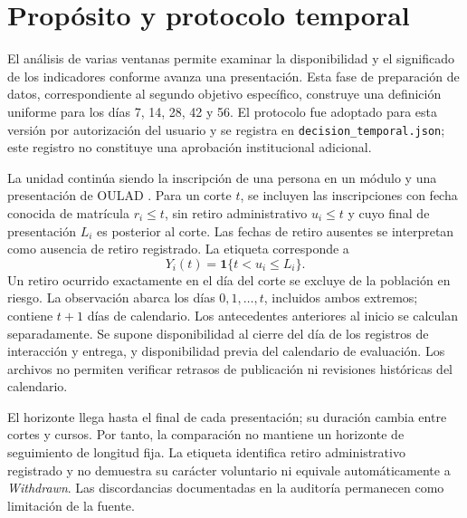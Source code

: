 \section{Propósito y protocolo temporal}
El análisis de varias ventanas permite examinar la disponibilidad y el significado de los indicadores conforme avanza una presentación. Esta fase de preparación de datos, correspondiente al segundo objetivo específico, construye una definición uniforme para los días 7, 14, 28, 42 y 56. El protocolo fue adoptado para esta versión por autorización del usuario y se registra en \texttt{decision\_temporal.json}; este registro no constituye una aprobación institucional adicional.

La unidad continúa siendo la inscripción de una persona en un módulo y una presentación de OULAD \cite{sdata2017171}. Para un corte $t$, se incluyen las inscripciones con fecha conocida de matrícula $r_i\leq t$, sin retiro administrativo $u_i\leq t$ y cuyo final de presentación $L_i$ es posterior al corte. Las fechas de retiro ausentes se interpretan como ausencia de retiro registrado. La etiqueta corresponde a
\[
Y_i(t)=\mathbf{1}\{t<u_i\leq L_i\}.
\]
Un retiro ocurrido exactamente en el día del corte se excluye de la población en riesgo. La observación abarca los días $0,1,\ldots,t$, incluidos ambos extremos; contiene $t+1$ días de calendario. Los antecedentes anteriores al inicio se calculan separadamente. Se supone disponibilidad al cierre del día de los registros de interacción y entrega, y disponibilidad previa del calendario de evaluación. Los archivos no permiten verificar retrasos de publicación ni revisiones históricas del calendario.

El horizonte llega hasta el final de cada presentación; su duración cambia entre cortes y cursos. Por tanto, la comparación no mantiene un horizonte de seguimiento de longitud fija. La etiqueta identifica retiro administrativo registrado y no demuestra su carácter voluntario ni equivale automáticamente a \textit{Withdrawn}. Las discordancias documentadas en la auditoría permanecen como limitación de la fuente.

